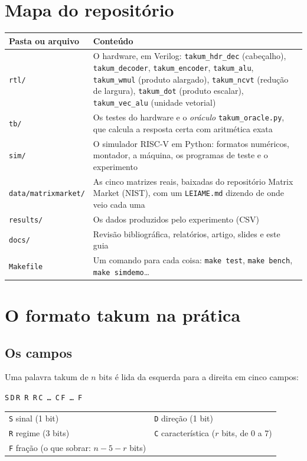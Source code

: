 \documentclass[11pt,a4paper]{article}
\newcommand{\code}[1]{\texttt{#1}}
\newcommand{\bS}[1]{\colorbox{gray!25}{\texttt{#1}}}
\newcommand{\bD}[1]{\colorbox{blue!18}{\texttt{#1}}}
\newcommand{\bR}[1]{\colorbox{blue!8}{\texttt{#1}}}
\newcommand{\bC}[1]{\colorbox{orange!25}{\texttt{#1}}}
\newcommand{\bF}[1]{\colorbox{green!18}{\texttt{#1}}}
\begin{document}
\section{Mapa do repositório}

\begin{center}
\begin{tabularx}{\linewidth}{lX}
\toprule
Pasta ou arquivo & Conteúdo \\
\midrule
\code{rtl/} & O hardware, em Verilog: \code{takum\_hdr\_dec} (cabeçalho), \code{takum\_decoder},
  \code{takum\_encoder}, \code{takum\_alu}, \code{takum\_wmul} (produto alargado), \code{takum\_ncvt}
  (redução de largura), \code{takum\_dot} (produto escalar), \code{takum\_vec\_alu} (unidade vetorial) \\
\code{tb/} & Os testes do hardware e o \emph{oráculo} \code{takum\_oracle.py}, que calcula a resposta
  certa com aritmética exata \\
\code{sim/} & O simulador RISC-V em Python: formatos numéricos, montador, a máquina, os programas de teste
  e o experimento \\
\code{data/matrixmarket/} & As cinco matrizes reais, baixadas do repositório Matrix Market (NIST), com
  um \code{LEIAME.md} dizendo de onde veio cada uma \\
\code{results/} & Os dados produzidos pelo experimento (CSV) \\
\code{docs/} & Revisão bibliográfica, relatórios, artigo, slides e este guia \\
\code{Makefile} & Um comando para cada coisa: \code{make test}, \code{make bench}, \code{make simdemo}\ldots \\
\bottomrule
\end{tabularx}
\end{center}

\section{O formato takum na prática}

\subsection{Os campos}

Uma palavra takum de $n$ bits é lida da esquerda para a direita em cinco campos:

\begin{center}
\bS{S}\,\bD{D}\,\bR{R R R}\,\bC{C \ldots\ C}\,\bF{F \ldots\ F}
\qquad
\begin{tabular}{@{}ll@{}}
\bS{S} sinal (1 bit) & \bD{D} direção (1 bit)\\
\bR{R} regime (3 bits) & \bC{C} característica ($r$ bits, de 0 a 7)\\
\bF{F} fração (o que sobrar: $n-5-r$ bits) &
\end{tabular}
\end{center}
\end{document}
